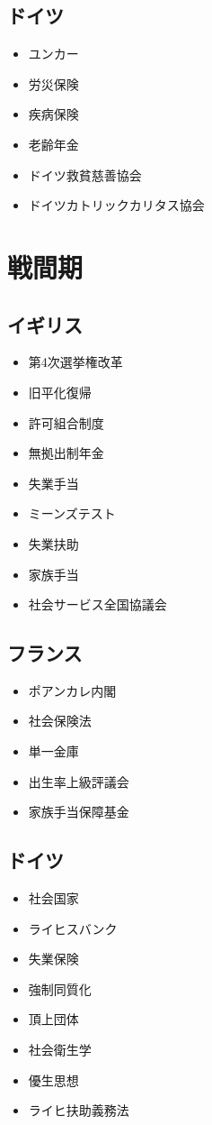 \documentclass{jsarticle}
\begin{document}
\subsection{ドイツ}
\begin{itemize}
	\item ユンカー
	\item 労災保険
	\item 疾病保険
	\item 老齢年金
	\item ドイツ救貧慈善協会
	\item ドイツカトリックカリタス協会
\end{itemize}


\section{戦間期}

\subsection{イギリス}
\begin{itemize}
	\item 第4次選挙権改革
	\item 旧平化復帰
	\item 許可組合制度
	\item 無拠出制年金
	\item 失業手当
	\item ミーンズテスト
	\item 失業扶助
	\item 家族手当
	\item 社会サービス全国協議会
\end{itemize}

\subsection{フランス}
\begin{itemize}
	\item ポアンカレ内閣
	\item 社会保険法
	\item 単一金庫
	\item 出生率上級評議会
	\item 家族手当保障基金
\end{itemize}

\subsection{ドイツ}
\begin{itemize}
	\item 社会国家
	\item ライヒスバンク
	\item 失業保険
	\item 強制同質化
	\item 頂上団体
	\item 社会衛生学
	\item 優生思想
	\item ライヒ扶助義務法
\end{itemize}
\end{document}
